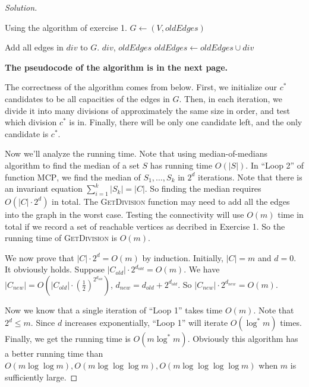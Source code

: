 \begin{proof}[Solution]
\begin{algorithm}
\begin{algorithmic}
                 \Comment Using the algorithm of exercise 1.
                \State $G\gets (V, oldEdges)$
                
                \State Add all edges in $div$ to $G$.
                \State \Return $div$, $oldEdges$
                \Else
                \State $oldEdges \gets oldEdges \cup div$
                \EndIf
                \EndFor
                \EndFunction
            \end{algorithmic}
        \end{algorithm}
        
        {\bf The pseudocode of the algorithm is in the next page.}
        
        The correctness of the algorithm comes from below.
        First, we initialize our $c^*$ candidates to be all capacities of the edges in $G$.
        Then, in each iteration, we divide it into many divisions of approximately the same size in order, and test which division $c^*$ is in.
        Finally, there will be only one candidate left, and the only candidate is $c^*$.
        
        Now we'll analyze the running time.
        Note that using median-of-medians algorithm to find the median of a set $S$ has running time $O(|S|)$.
        In ``Loop 2'' of function \textsc{MCP}, we find the median of $S_1,\ldots,S_k$ in $2^d$ iterations.
        Note that there is an invariant equation $\sum_{i=1}^{k}|S_k|=|C|$.
        So finding the median requires $O(|C|\cdot 2^{d})$ in total.
        The \textsc{GetDivision} function may need to add all the edges into the graph in the worst case.
        Testing the connectivity will use $O(m)$ time in total if we record a set of reachable vertices as decribed in Exercise 1.
        So the running time of \textsc{GetDivision} is $O(m)$.
        
        We now prove that $|C|\cdot 2^{d}=O(m)$ by induction.
        Initially, $|C|=m$ and $d=0$.
        It obviously holds.
        Suppose $|C_{old}|\cdot 2^{d_{old}}=O(m)$.
        We have $|C_{new}|=O(|C_{old}|\cdot (\frac{1}{2})^{2^{d_{old}}})$,
        $d_{new}=d_{old}+2^{d_{old}}$.
        So  $|C_{new}|\cdot 2^{d_{new}}=O(m)$.
        
        Now we know that a single iteration of ``Loop 1'' takes time $O(m)$.
        Note that $2^{d}\leqslant m$.
        Since $d$ increases exponentially, ``Loop 1'' will iterate $O(\log^*m)$ times.
        Finally, we get the running time is $O(m\log^*m)$.
        Obviously this algorithm has a better running time than $O(m\log\log m),O(m\log\log\log m),O(m\log\log\log\log m)$ when $m$ is sufficiently large.
    \end{proof}
    

